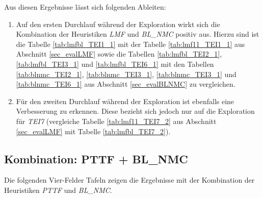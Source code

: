 \begin{multicols}{2}
\columnbreak
{}
\end{multicols}
\noindent
Aus diesen Ergebnisse lässt sich folgenden Ableiten:
\begin{enumerate}
\item Auf den ersten Durchlauf während der Exploration wirkt sich die Kombination der Heuristiken \emph{LMF} und \emph{BL\_NMC} positiv aus. Hierzu sind ist die Tabelle \ref{tab:lmfbl_TEI1_1} mit der Tabelle \ref{tab:lmf11_TEI1_1} aus Abschnitt \ref{sec_evalLMF} sowie die Tabellen \ref{tab:lmfbl_TEI2_1}, \ref{tab:lmfbl_TEI3_1} und \ref{tab:lmfbl_TEI6_1} mit den Tabellen \ref{tab:blnmc_TEI2_1}, \ref{tab:blnmc_TEI3_1}, \ref{tab:blnmc_TEI3_1} und \ref{tab:blnmc_TEI6_1} aus Abschnitt \ref{sec_evalBLNMC} zu vergleichen.
\item Für den zweiten Durchlauf während der Exploration ist ebenfalls eine Verbesserung zu erkennen. Diese bezieht sich jedoch nur auf die Exploration für \emph{TEI7} (vergleiche Tabelle \ref{tab:lmf11_TEI7_2} aus Abschnitt \ref{sec_evalLMF} mit Tabelle \ref{tab:lmfbl_TEI7_2}).
\end{enumerate}

\subsection{Kombination: PTTF + BL\_NMC}\label{sec_evalPTTFBLNMC}
Die folgenden Vier-Felder Tafeln zeigen die Ergebnisse mit der Kombination der Heuristiken \emph{PTTF} und \emph{BL\_NMC}.
\begin{multicols}{3}
\columnbreak
{}\columnbreak
{}
\end{multicols}

\begin{multicols}{2}
\columnbreak
{}
\end{multicols}

